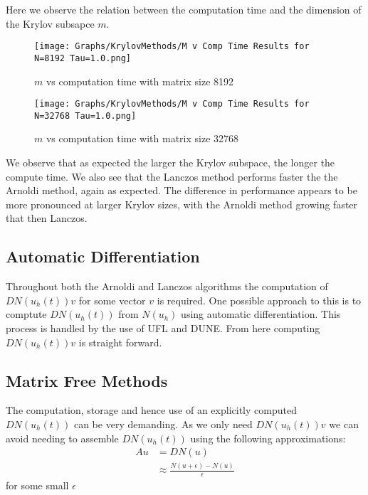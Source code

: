 Here we observe the relation between the computation time and the dimension of the Krylov subsapce $m$.
\begin{figure}[H]
    \centering
    \begin{minipage}{0.49\textwidth}
        \texttt{[image: Graphs/KrylovMethods/M v Comp Time Results for N=8192 Tau=1.0.png]} %
        \caption{$m$ vs computation time with matrix size 8192}
        \label{fig:mCTKrylov1}
    \end{minipage}\hfill
    \centering
    \begin{minipage}{0.49\textwidth}
        \texttt{[image: Graphs/KrylovMethods/M v Comp Time Results for N=32768 Tau=1.0.png]} %
        \caption{$m$ vs computation time with matrix size 32768}
        \label{fig:mCTKrylov2}
    \end{minipage}\hfill
\end{figure}
We observe that as expected the larger the Krylov subspace, the longer the compute time.
We also see that the Lanczos method performs faster the the Arnoldi method, again as expected.
The difference in performance appears to be more pronounced at larger Krylov sizes, with the Arnoldi method growing faster that then Lanczos.

\subsection{Automatic Differentiation}
Throughout both the Arnoldi and Lanczos algorithms the computation of $DN(u_h(t))v$ for some vector $v$ is required.
One possible approach to this is to comptute $DN(u_h(t))$ from $N(u_h)$ using automatic differentiation.
This process is handled by the use of UFL\cite{Alnaes2014} and DUNE\cite{Bastian2021}.
From here computing $DN(u_h(t))v$ is straight forward.

\subsection{Matrix Free Methods}
The computation, storage and hence use of an explicitly computed $DN(u_h(t))$ can be very demanding.
As we only need $DN(u_h(t))v$ we can avoid needing to assemble $DN(u_h(t))$ using the following approximations:
\begin{align*}
    Au &= DN(u)\\
    &\approx \frac{N(u+\epsilon)-N(u)}{\epsilon}
\end{align*}
for some small $\epsilon$